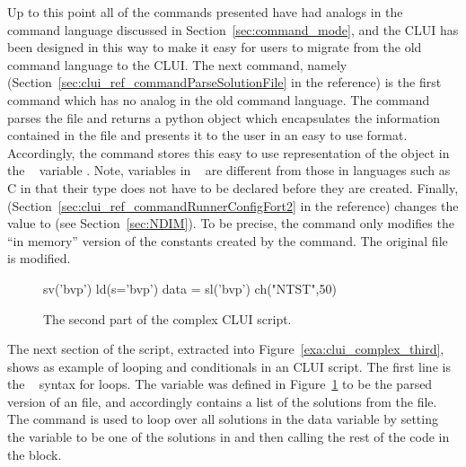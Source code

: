 \documentclass[12pt]{report}
\begin{document}
 Up to this point all of the commands presented have had
 analogs in the command language discussed in 
 Section~\ref{sec:command_mode}, and the \AUTO CLUI has
 been designed in this way to make it easy for users to
 migrate from the old command language to the
 \AUTO CLUI.  The next command, namely 
 (Section~\ref{sec:clui_ref_commandParseSolutionFile} in the reference)
 is the first command which has no analog in the 
 old command language.
 The command  parses the file 
 and returns a python object which encapsulates the
 information contained in the file and presents it to the
 user in an easy to use format.  Accordingly, the
 command  stores this easy to
 use representation of the object in the \python~
 variable .
 Note, variables in \python~ are different from those in languages
 such as {\cal C} in that their type does not have to be
 declared before they are created.
 Finally,   
 (Section~\ref{sec:clui_ref_commandRunnerConfigFort2} in the reference)
 changes the  value to  (see Section~\ref{sec:NDIM}).
 To be precise, the command  only modifies
 the ``in memory'' version of the \AUTO constants created
 by the  command.
 The original file  is  modified.

 \begin{figure}[htbp]
 {\small \begin{center} \begin{boxedverbatim}
 sv('bvp')
 ld(s='bvp')
 data = sl('bvp')
 ch("NTST",50)
 \end{boxedverbatim}
 \end{center} 
 }
 \caption[The second part of the  complex \AUTO CLUI script.]
 {The second part of the  complex \AUTO CLUI script.}
 \label{exa:clui_complex_second}
 \end{figure}

 The next section of the script, extracted into 
 Figure~\ref{exa:clui_complex_third}, shows as example
 of looping and conditionals in an \AUTO CLUI script.
 The first line  is
 the \python~ syntax for loops.  The  variable
 was defined in Figure~\ref{exa:clui_complex_second}
 to be the parsed version of an \AUTO {}
 file, and accordingly contains a list of the solutions
 from the  file.  The command 
  is used to loop
 over all solutions in the data variable by 
 setting the variable  to
 be one of the solutions in 
 and then calling the rest of the code in the
 block.  
\end{document}
